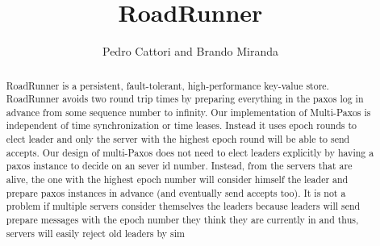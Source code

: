 \documentclass[a4paper]{article}
\title{RoadRunner}
\author{Pedro Cattori and Brando Miranda}
\begin{document}
\maketitle

\begin{abstract}
RoadRunner is a persistent, fault-tolerant, high-performance key-value store. RoadRunner avoids two round trip times by preparing everything in the paxos log in advance from some sequence number to infinity. Our implementation of Multi-Paxos is independent of time synchronization or time leases. Instead it uses epoch rounds to elect leader and only the server with the highest epoch round will be able to send accepts. Our design of multi-Paxos does not need to elect leaders explicitly by having a paxos instance to decide on an sever id number. Instead, from the servers that are alive, the one with the highest epoch number will consider himself the leader and prepare paxos instances in advance (and eventually send accepts too). It is not a problem if multiple servers consider themselves the leaders because leaders will send prepare messages with the epoch number they think they are currently in and thus, servers will easily reject old leaders by sim
\end{abstract}
\end{document}
